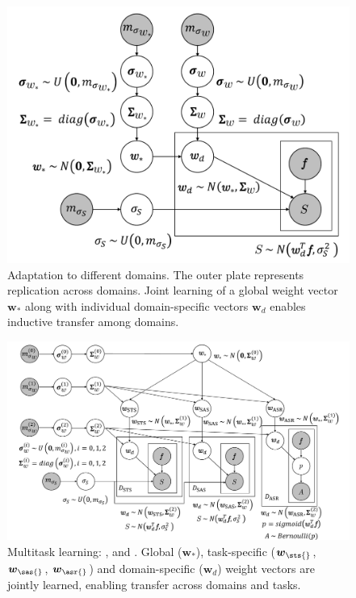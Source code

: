 \begin{figure}[t]
\centering
\includegraphics[trim={6mm 0 0 0},clip,scale=0.35]{2016_naacl_stsdomain/figures/da_sts_model_practical.pdf}
\caption{Adaptation to different \sts{} domains. The outer plate represents replication across
domains. Joint learning of a global weight vector $\boldsymbol{w}_*$ along with individual
domain-specific vectors $\boldsymbol{w}_d$ enables inductive transfer among domains.}
\label{figure:da-sts-model}
\end{figure}

\begin{figure}[ht]
\centering
\includegraphics[scale=0.35]{2016_naacl_stsdomain/figures/three_level_da_sts_sas_qa_model_practical.pdf}
\caption{
Multitask learning: \sts{}, \sas{} and \asr{}.  Global
($\boldsymbol{w}_*$), task-specific ($\boldsymbol{w}_{\sts{}}$,
$\boldsymbol{w}_{\sas{}}$, $\boldsymbol{w}_{\asr{}}$) and
domain-specific ($\boldsymbol{w}_{d}$) weight vectors are jointly
learned, enabling transfer across domains and tasks.}

\label{figure:mtl-sts-sas-asr-model}
\end{figure}





